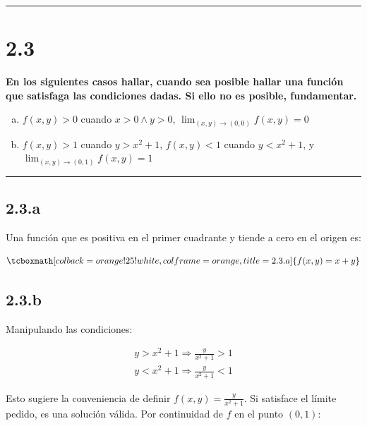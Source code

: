 \documentclass{article}
\begin{document}
\hrule
\vspace{10 pt}

\section*{2.3}
\label{sec:2.3}

\textbf{En los siguientes casos hallar, cuando sea posible hallar una función que satisfaga las condiciones dadas. Si ello no es posible, fundamentar.} 

\begin{enumerate}[(a)]
\bfseries
\item $ f(x,y) > 0$ cuando $x > 0 \wedge y > 0$, $\lim_{(x,y) \rightarrow (0,0)} f(x,y) = 0$

\item $f(x,y) > 1$ cuando $y > x^2 + 1$, $f(x,y) < 1$ cuando $y < x^2 + 1$, y $\lim_{(x,y) \rightarrow (0,1)} f(x,y) = 1$
\end{enumerate}
\hrule

\subsection*{2.3.a}
\label{subsec:2.3.a}

Una función que es positiva en el primer cuadrante y tiende a cero en el origen es:

\begin{equation}
\tcboxmath[colback=orange!25!white,colframe=orange,title=2.3.a]
{ f(x,y) = x + y }
\end{equation}

\subsection*{2.3.b}
\label{subsec:2.3.b}

Manipulando las condiciones:

\begin{align}
y > x^2 + 1 \Rightarrow \frac{y}{x^2 + 1} > 1 \\
y < x^2 + 1 \Rightarrow \frac{y}{x^2 + 1} < 1
\end{align}

Esto sugiere la conveniencia de definir $f(x,y) = \frac{y}{x^2+1}$. Si satisface el límite pedido, es una solución válida.
Por continuidad de $f$ en el punto $(0, 1)$:
\end{document}

